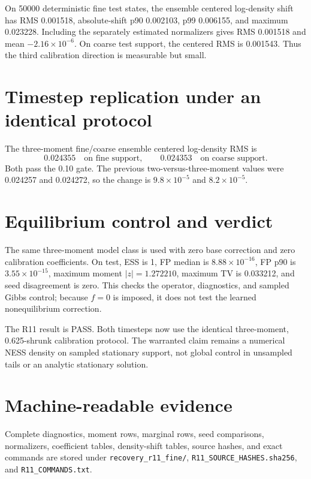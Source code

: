 \documentclass[11pt]{article}
\begin{document}
On 50000 deterministic fine test states, the ensemble centered log-density
shift has RMS 0.001518, absolute-shift p90 0.002103, p99 0.006155, and maximum
0.023228.  Including the separately estimated normalizers gives RMS 0.001518
and mean $-2.16\times10^{-6}$.  On coarse test support, the centered RMS is
0.001543.  Thus the third calibration direction is measurable but small.

\section{Timestep replication under an identical protocol}

The three-moment fine/coarse ensemble centered log-density RMS is
\[
 0.024355\quad\text{on fine support},\qquad
 0.024353\quad\text{on coarse support}.
\]
Both pass the 0.10 gate.  The previous two-versus-three-moment values were
0.024257 and 0.024272, so the change is $9.8\times10^{-5}$ and
$8.2\times10^{-5}$.

\section{Equilibrium control and verdict}

The same three-moment model class is used with zero base correction and zero
calibration coefficients.  On test, ESS is 1, FP median is
$8.88\times10^{-16}$, FP p90 is $3.55\times10^{-15}$, maximum moment
$|z|=1.272210$, maximum TV is 0.033212, and seed disagreement is zero.  This
checks the operator, diagnostics, and sampled Gibbs control; because $f=0$
is imposed, it does not test the learned nonequilibrium correction.

The R11 result is PASS.  Both timesteps now use the identical three-moment,
0.625-shrunk calibration protocol.  The warranted claim remains a numerical
NESS density on sampled stationary support, not global control in unsampled
tails or an analytic stationary solution.

\section*{Machine-readable evidence}

Complete diagnostics, moment rows, marginal rows, seed comparisons,
normalizers, coefficient tables, density-shift tables, source hashes, and exact
commands are stored under
\nolinkurl{recovery_r11_fine/},
\nolinkurl{R11_SOURCE_HASHES.sha256}, and
\nolinkurl{R11_COMMANDS.txt}.
\end{document}
